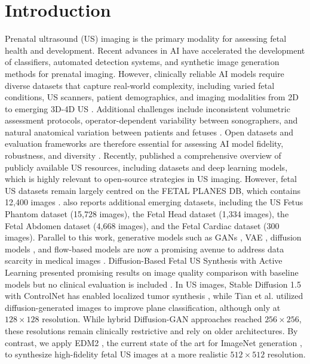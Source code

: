 \documentclass[runningheads]{llncs}
\begin{document}
\vspace{-9mm}
\section{Introduction}
Prenatal ultrasound (US) imaging is the primary modality for assessing fetal health and development. Recent advances in AI have accelerated the development of classifiers, automated detection systems, and synthetic image generation methods for prenatal imaging. However, clinically reliable AI models require diverse datasets that capture real-world complexity, including varied fetal conditions, US scanners, patient demographics, and imaging modalities from 2D to emerging 3D-4D US \cite{kurjak2007useful}. Additional challenges include inconsistent volumetric assessment protocols, operator-dependent variability between sonographers, and natural anatomical variation between patients and fetuses \cite{jcm13185626}.
Open datasets and evaluation frameworks are therefore essential for assessing AI model fidelity, robustness, and diversity \cite{IBRAHIM2025}.
Recently, \cite{Alsharid2025} published a comprehensive overview of publicly available US resources, including datasets and deep learning models, which is highly relevant to open-source strategies in US imaging.
However, fetal US datasets remain largely centred on the FETAL PLANES DB, which contains 12,400 images \cite{burgos2020evaluation}. \cite{Alsharid2025} also reports additional emerging datasets, including the US Fetus Phantom dataset (15,728 images), the Fetal Head dataset (1,334 images), the Fetal Abdomen dataset (4,668 images), and the Fetal Cardiac dataset (300 images).
Parallel to this work, generative models such as GANs \cite{Goodfellow2014}, VAE \cite{kingma2013auto}, diffusion models \cite{ho2020_neurips}, and flow-based models \cite{lipman2022flow} are now a promising avenue to address data scarcity in medical images \cite{yan2018generation,tian2025enhancing}.
Diffusion-Based Fetal US Synthesis with Active Learning presented promising results on image quality comparison with baseline models but no clinical evaluation is included \cite{Arjemandi2026}. In US images, Stable Diffusion 1.5 \cite{rombach2022high} with ControlNet \cite{zhang2023adding} has enabled localized tumor synthesis \cite{freiche2025ultrasound}, while Tian et al. \cite{tian2025enhancing} utilized diffusion-generated images to improve plane classification, although only at $128 \times 128$ resolution. While hybrid Diffusion-GAN approaches \cite{iskandar2023towards} reached $256 \times 256$, these resolutions remain clinically restrictive and rely on older architectures. By contrast, we apply EDM2 \cite{karras2024analyzing}, the current state of the art for ImageNet generation \cite{deng2009imagenet}, to synthesize high-fidelity fetal US images at a more realistic $512 \times 512$ resolution.
\end{document}
